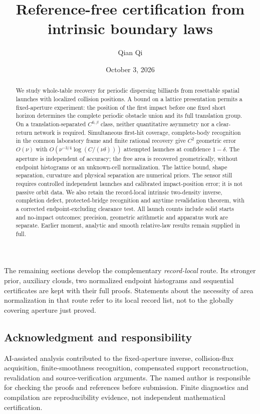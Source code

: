 \documentclass[11pt]{amsart}
\title[Reference-free certification]{Reference-free certification from intrinsic boundary laws}
\author{Qian Qi}\date{October 3, 2026}
\theoremstyle{definition}\newtheorem{definition}[theorem]{Definition}
\theoremstyle{remark}\newtheorem{remark}[theorem]{Remark}
\numberwithin{equation}{section}
\begin{document}
\raggedbottom
\begin{abstract}
We study whole-table recovery for periodic dispersing billiards from
resettable spatial launches with localized collision positions. A bound
on a lattice presentation permits a fixed-aperture experiment: the
position of the first impact before one fixed short horizon determines
the complete periodic obstacle union and its full translation group.
On a translation-separated $C^{6,\beta}$ class, neither quantitative
asymmetry nor a clear-return network is required. Simultaneous first-hit
coverage, complete-body recognition in the common laboratory frame and
finite rational recovery give $C^2$ geometric error $O(\nu)$ with
$O(\nu^{-3/4}\log(C/(\nu\delta)))$ attempted launches at confidence
$1-\delta$. The aperture is independent of accuracy; the free area is
recovered geometrically, without endpoint histograms or an unknown-cell
normalization. The lattice bound, shape separation, curvature and physical
separation are numerical priors. The sensor still requires controlled
independent launches and calibrated impact-position error; it is not
passive orbit data. We also retain the record-local intrinsic two-density
inverse, completion defect, protected-bridge recognition and anytime
revalidation theorem, with a corrected endpoint-excluding clearance test.
All launch counts include solid starts and no-impact outcomes; precision,
geometric arithmetic and apparatus work are separate. Earlier moment,
analytic and smooth relative-law results remain supplied in full.
\end{abstract}
\maketitle

\bigskip\noindent
The remaining sections develop the complementary \emph{record-local}
route. Its stronger prior, auxiliary clouds, two normalized endpoint
histograms and sequential certificates are kept with their full proofs.
Statements about the necessity of area normalization in that route refer
to its local record list, not to the globally covering aperture just proved.







\subsection*{Acknowledgment and responsibility}
AI-assisted analysis contributed to the fixed-aperture inverse,
collision-flux acquisition, finite-smoothness recognition, compensated
support reconstruction, revalidation and source-verification arguments. The named author is responsible for checking the proofs and
references before submission. Finite diagnostics and compilation are
reproducibility evidence, not independent mathematical certification.

\end{document}
